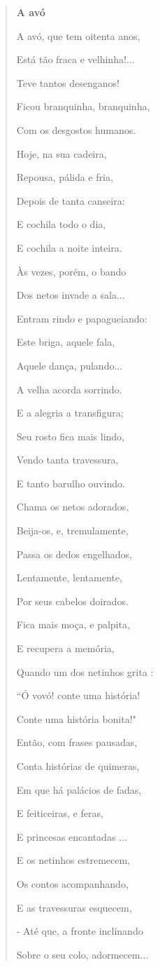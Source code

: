 \begin{quote}
\textbf{A avó}


A avó, que tem oitenta anos,

Está tão fraca e velhinha!...

Teve tantos desenganos!

Ficou branquinha, branquinha,

Com os desgostos humanos.


Hoje, na sua cadeira,

Repousa, pálida e fria,

Depois de tanta canseira:

E cochila todo o dia,

E cochila a noite inteira.


Às vezes, porém, o bando

Dos netos invade a sala...

Entram rindo e papagueiando:

Este briga, aquele fala,

Aquele dança, pulando...


A velha acorda sorrindo.

E a alegria a transfigura;

Seu rosto fica mais lindo,

Vendo tanta travessura,

E tanto barulho ouvindo.


Chama os netos adorados,

Beija-os, e, tremulamente,

Passa os dedos engelhados,

Lentamente, lentamente,

Por seus cabelos doirados.


Fica mais moça, e palpita,

E recupera a memória,

Quando um dos netinhos grita :

“Ó vovó! conte uma história!

Conte uma história bonita!"


Então, com frases pausadas,

Conta histórias de quimeras,

Em que há palácios de fadas,

E feiticeiras, e feras,

E princesas encantadas ...


E os netinhos estremecem,

Os contos acompanhando,

E as travessuras esquecem,

- Até que, a fronte inclinando

Sobre o seu colo, adormecem...

\end{quote}

